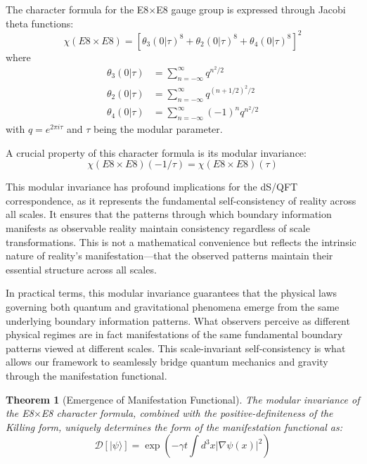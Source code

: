 \documentclass[11pt,english,twoside]{article}
\theoremstyle{plain}
\newtheorem{theorem}{Theorem}[section]
\theoremstyle{definition}
\theoremstyle{remark}
\newcommand{\D}{{\mathcal{D}}}
\newcommand{\gammaR}{\gamma}
\begin{document}
The character formula for the E8$\times$E8 gauge group is expressed through Jacobi theta functions:
\begin{equation}
\label{eq:character}
\chi(E8\times E8) = [\theta_3(0|\tau)^8 + \theta_2(0|\tau)^8 + \theta_4(0|\tau)^8]^2
\end{equation}
where
\begin{align}
\theta_3(0|\tau) &= \sum_{n=-\infty}^{\infty} q^{n^2/2} \\
\theta_2(0|\tau) &= \sum_{n=-\infty}^{\infty} q^{(n+1/2)^2/2} \\
\theta_4(0|\tau) &= \sum_{n=-\infty}^{\infty} (-1)^n q^{n^2/2}
\end{align}
with $q = e^{2\pi i \tau}$ and $\tau$ being the modular parameter.

A crucial property of this character formula is its modular invariance:
\begin{equation}
\label{eq:modular_invariance}
\chi(E8\times E8)(-1/\tau) = \chi(E8\times E8)(\tau)
\end{equation}

This modular invariance has profound implications for the dS/QFT correspondence, as it represents the fundamental self-consistency of reality across all scales. It ensures that the patterns through which boundary information manifests as observable reality maintain consistency regardless of scale transformations. This is not a mathematical convenience but reflects the intrinsic nature of reality's manifestation—that the observed patterns maintain their essential structure across all scales.

In practical terms, this modular invariance guarantees that the physical laws governing both quantum and gravitational phenomena emerge from the same underlying boundary information patterns. What observers perceive as different physical regimes are in fact manifestations of the same fundamental boundary patterns viewed at different scales. This scale-invariant self-consistency is what allows our framework to seamlessly bridge quantum mechanics and gravity through the manifestation functional.

\begin{theorem}[Emergence of Manifestation Functional]
\label{thm:manifestation}
The modular invariance of the E8$\times$E8 character formula, combined with the positive-definiteness of the Killing form, uniquely determines the form of the manifestation functional as:
\begin{equation}
\D[|\psi\rangle] = \exp(-\gammaR t\int d^3x |\nabla\psi(x)|^2)
\end{equation}
\end{theorem}
\end{document}
